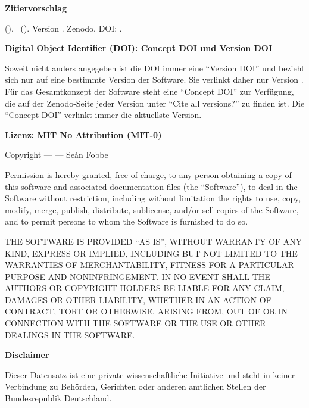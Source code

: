 \vspace{0.5cm}

\textbf{Zitiervorschlag}

\emph{\projectauthor} (\the\year ). \softwaretitle\ (\softwareshort ). Version \version . Zenodo. DOI: \softwareversiondoi .


\vspace{0.5cm}

\textbf{Digital Object Identifier (DOI): Concept DOI und Version DOI}

Soweit nicht anders angegeben ist die DOI immer eine \enquote{Version DOI} und bezieht sich nur auf eine bestimmte Version der Software. Sie verlinkt daher nur Version \version . Für das Gesamtkonzept der Software steht eine \enquote{Concept DOI} zur Verfügung, die auf der Zenodo-Seite jeder Version unter \enquote{Cite all versions?} zu finden ist. Die \enquote{Concept DOI} verlinkt immer die aktuellste Version.

\vspace{0.5cm}


\textbf{Lizenz: MIT No Attribution (MIT-0)}

Copyright --- \the\year --- Seán Fobbe

Permission is hereby granted, free of charge, to any person obtaining a copy of this software and associated documentation files (the \enquote{Software}), to deal in the Software without restriction, including without limitation the rights to use, copy, modify, merge, publish, distribute, sublicense, and/or sell copies of the Software, and to permit persons to whom the Software is furnished to do so.

 
THE SOFTWARE IS PROVIDED \enquote{AS IS}, WITHOUT WARRANTY OF ANY KIND, EXPRESS OR IMPLIED, INCLUDING BUT NOT LIMITED TO THE WARRANTIES OF MERCHANTABILITY, FITNESS FOR A PARTICULAR PURPOSE AND NONINFRINGEMENT. IN NO EVENT SHALL THE AUTHORS OR COPYRIGHT HOLDERS BE LIABLE FOR ANY CLAIM, DAMAGES OR OTHER LIABILITY, WHETHER IN AN ACTION OF CONTRACT, TORT OR OTHERWISE, ARISING FROM, OUT OF OR IN CONNECTION WITH THE SOFTWARE OR THE USE OR OTHER DEALINGS IN THE SOFTWARE. 


\vspace{0.5cm}

\textbf{Disclaimer} 

Dieser Datensatz ist eine private wissenschaftliche Initiative und steht in keiner Verbindung zu Behörden, Gerichten oder anderen amtlichen Stellen der Bundesrepublik Deutschland.

\newpage